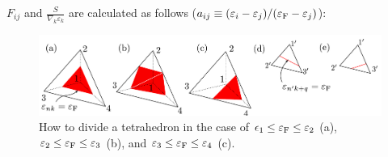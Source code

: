 \documentclass[12pt]{article}
\begin{document}
$F_{i j}$ and $\frac{S}{\nabla_k \varepsilon_k}$ are calculated as follows 
($a_{i j} \equiv (\varepsilon_i - \varepsilon_j)/(\varepsilon_{\rm F} - \varepsilon_j)$):

\begin{figure}[!tb]
  \includegraphics[width=16cm]{pic/elph_tetra.pdf}
  \caption{\label{fig_elph_tetra}
    How to divide a tetrahedron 
    in the case of $\epsilon_1 \leq \varepsilon_{\rm F} \leq \varepsilon_2$ (a), 
    $\varepsilon_2 \leq \varepsilon_{\rm F} \leq \varepsilon_3$ (b), and
    $\varepsilon_3 \leq \varepsilon_{\rm F} \leq \varepsilon_4$ (c).
  }
\end{figure}
\end{document}
